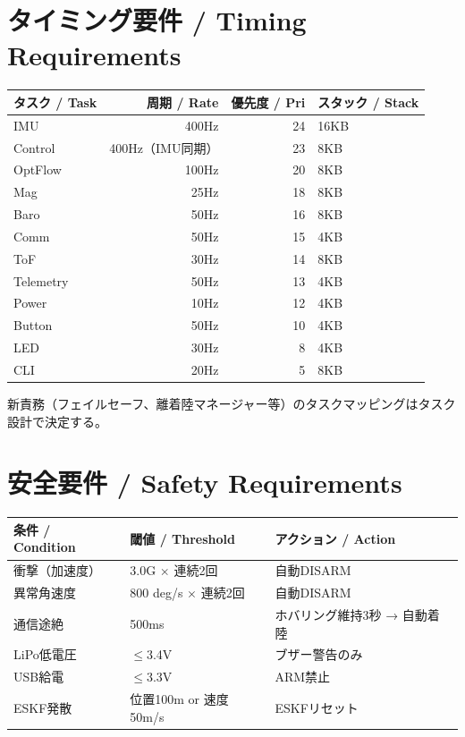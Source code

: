 \documentclass[a4paper,11pt]{article}
\newcommand{\thead}[1]{\textbf{\color{accentdark}#1}}
\begin{document}
\section{タイミング要件 / Timing Requirements}

\begin{table}[h]
\centering
\begin{tabular}{@{}lrrl@{}}
\toprule
\thead{タスク / Task} & \thead{周期 / Rate} & \thead{優先度 / Pri} & \thead{スタック / Stack} \\
\midrule
IMU & 400Hz & 24 & 16KB \\
Control & 400Hz（IMU同期） & 23 & 8KB \\
OptFlow & 100Hz & 20 & 8KB \\
Mag & 25Hz & 18 & 8KB \\
Baro & 50Hz & 16 & 8KB \\
Comm & 50Hz & 15 & 4KB \\
ToF & 30Hz & 14 & 8KB \\
Telemetry & 50Hz & 13 & 4KB \\
Power & 10Hz & 12 & 4KB \\
Button & 50Hz & 10 & 4KB \\
LED & 30Hz & 8 & 4KB \\
CLI & 20Hz & 5 & 8KB \\
\bottomrule
\end{tabular}
\end{table}

新責務（フェイルセーフ、離着陸マネージャー等）のタスクマッピングはタスク設計で決定する。

\section{安全要件 / Safety Requirements}

\begin{table}[h]
\centering
\begin{tabular}{@{}lll@{}}
\toprule
\thead{条件 / Condition} & \thead{閾値 / Threshold} & \thead{アクション / Action} \\
\midrule
衝撃（加速度） & 3.0G $\times$ 連続2回 & 自動DISARM \\
異常角速度 & 800 deg/s $\times$ 連続2回 & 自動DISARM \\
通信途絶 & 500ms & ホバリング維持3秒 → 自動着陸 \\
LiPo低電圧 & $\leq$3.4V & ブザー警告のみ \\
USB給電 & $\leq$3.3V & ARM禁止 \\
ESKF発散 & 位置100m or 速度50m/s & ESKFリセット \\
\bottomrule
\end{tabular}
\end{table}
\end{document}
